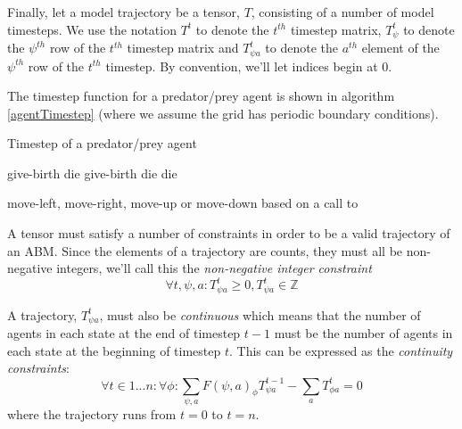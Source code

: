 \documentclass{article}
\begin{document}
Finally, let a model trajectory be a tensor, $T$, consisting of a number of model timesteps. We use the notation $T^t$ to denote the $t^{th}$ timestep matrix, $T^t_\psi$ to denote the $\psi^{th}$ row of the $t^{th}$ timestep matrix and $T^t_{\psi a}$ to denote the $a^{th}$ element of the $\psi^{th}$ row of the $t^{th}$ timestep. By convention, we'll let indices begin at 0.

The timestep function for a predator/prey agent is shown in algorithm \ref{agentTimestep} (where we assume the grid has periodic boundary conditions).

\begin{algorithm}
	\caption{Timestep of a predator/prey agent}
	\label{agentTimestep}
	\begin{algorithmic}
		\State\Return give-birth 
		\EndIf
		\State\Return die
		\EndIf
		\Else
		\State\Return give-birth
		\EndIf
		\State\Return die
		\EndIf
		\State\Return die 
		\EndIf
		
		\EndIf
		\State \Return move-left, move-right, move-up or move-down based on a call to 
		\EndFunction
	\end{algorithmic}
\end{algorithm}

A tensor must satisfy a number of constraints in order to be a valid trajectory of an ABM. Since the elements of a trajectory are counts, they must all be non-negative integers, we'll call this the \textit{non-negative integer constraint}
\begin{equation}
\forall t,\psi, a: T^t_{\psi a} \ge 0, T^t_{\psi a} \in \mathbb{Z}
\label{nonNegativeInt}
\end{equation}

A trajectory, $T^t_{\psi a}$, must also be \textit{continuous} which means that the number of agents in each state at the end of timestep $t-1$ must be the number of agents in each state at the beginning of timestep $t$. This can be expressed as the \textit{continuity constraints}:
\begin{equation}
\forall t \in 1 ... n:\forall \phi: \sum_{\psi, a} F(\psi, a)_\phi T^{t-1}_{\psi a} - \sum_a T^t_{\phi a} = 0
\label{continuous}
\end{equation}
where the trajectory runs from $t=0$ to $t=n$.
\end{document}
